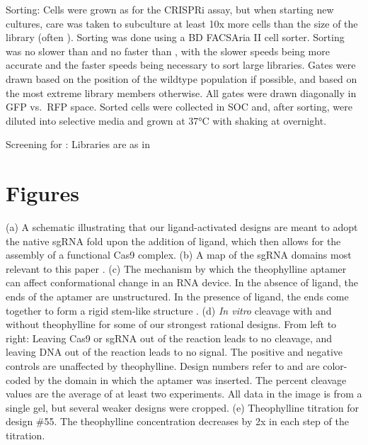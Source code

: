 \documentclass[10pt,oneside]{article}
\begin{document}
Sorting: Cells were grown as for the CRISPRi assay, but when starting new  
cultures, care was taken to subculture at least 10x more cells than the size of 
the library (often ).  Sorting was done using a BD FACSAria II cell 
sorter.  Sorting was no slower than  and no faster than 
, with the slower speeds being more accurate and the faster speeds 
being necessary to sort large libraries.  Gates were drawn based on the 
position of the wildtype population if possible, and based on the most extreme 
library members otherwise.  All gates were drawn diagonally in GFP vs.\ RFP 
space.  Sorted cells were collected in  SOC and, after sorting, were 
diluted into selective media and grown at 37°C with shaking at  
overnight.

Screening for \backrna{}: Libraries are as in 


\section{Figures}



 (a) A schematic illustrating that our ligand-activated designs are meant to 
 adopt the native sgRNA fold upon the addition of ligand, which then allows 
 for the assembly of a functional Cas9 complex.
 (b) A map of the sgRNA domains most relevant to this paper 
 \autocite{briner2014}.
 (c) The mechanism by which the theophylline aptamer can affect conformational 
 change in an RNA device.  In the absence of ligand, the ends of the aptamer 
 are unstructured.  In the presence of ligand, the ends come together to form 
 a rigid stem-like structure \autocite{zimmerman1997}.
 (d) \emph{In vitro} cleavage with and without theophylline for some of our 
 strongest rational designs.  From left to right: Leaving Cas9 or sgRNA out of 
 the reaction leads to no cleavage, and leaving DNA out of the reaction leads 
 to no signal.  The positive and negative controls are unaffected by 
 theophylline.  Design numbers refer to 
 and are color-coded by the domain in which the aptamer was inserted.  The 
 percent cleavage values are the average of at least two experiments.  All data 
 in the image is from a single gel, but several weaker designs were cropped.
 (e) Theophylline titration for design \#55.  The theophylline concentration 
 decreases by 2x in each step of the titration.
\end{document}
